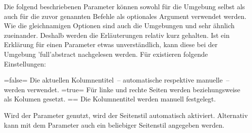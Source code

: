\begin{DeclareEntity*}{}
\begin{DeclareEntity*}{}
\begin{DeclareEntity*}{}
\begin{Declaration}
\begin{Declaration}
\begin{Declaration}
\begin{Declaration}
\begin{Declaration}
\begin{Declaration}
\begin{Declaration}
\begin{Declaration}
\begin{Declaration}
\begin{Declaration}
\begin{Declaration}
Die folgend beschriebenen Parameter können sowohl für die Umgebung 
 selbst als auch für die zuvor genannten Befehle als 
optionales Argument verwendet werden. Wie die gleichnamigen Optionen sind auch 
die Umgebungen  und  sehr 
ähnlich zueinander. Deshalb werden die Erläuterungen relativ kurz gehalten. Ist 
ein Erklärung für einen Parameter etwas unverständlich, kann diese bei der 
Umgebung \Environment'full'{abstract} nachgelesen werden.
%
%
Für  existieren folgende Einstellungen:
\begin{DeclareValues}
\itemval=false=
  Die aktuellen Kolumnentitel~-- automatische respektive manuelle~-- werden 
  verwendet.
\itemval*=true=
  Für linke und rechte Seiten werden  beziehungsweise 
   als Kolumen gesetzt.
\itemval==
  Die Kolumnentitel werden manuell festgelegt.
\end{DeclareValues}

Wird der Parameter  genutzt, wird der 
Seitenstil  automatisch aktiviert. Alternativ kann mit dem 
Parameter  auch ein beliebiger Seitenstil 
angegeben werden. 


\end{Declaration}
\end{Declaration}
\end{Declaration}
\end{Declaration}
\end{Declaration}
\end{Declaration}
\end{Declaration}
\end{Declaration}
\end{Declaration}
\end{Declaration}
\end{Declaration}
\end{DeclareEntity*}
\end{DeclareEntity*}
\end{DeclareEntity*}
